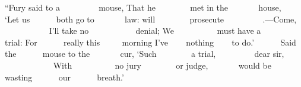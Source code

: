 \documentclass[11pt,openany,oneside]{book}
\begin{document}
{\small {\ttfamily “Fury said to a }}\newline
{\small {\ttfamily ~~~~~~~~ mouse, That he }}\newline
{\small {\ttfamily ~~~~~~~ met in the }}\newline
{\small {\ttfamily ~~~~~~ house, }}\newline
{\small {\ttfamily ~~~~ ‘Let us }}\newline
{\small {\ttfamily ~~~~~ both go to }}\newline
{\small {\ttfamily ~~~~~~ law: }}{\small {}}{\small {\ttfamily  will }}\newline
{\small {\ttfamily ~~~~~~~ prosecute }}\newline
{\small {\ttfamily ~~~~~~~~ }}{\small {}}{\small {\ttfamily .—Come, }}\newline
{\small {\ttfamily ~~~~~~~~~~ I’ll take no }}\newline
{\small {\ttfamily ~~~~~~~~~~ denial; We }}\newline
{\small {\ttfamily ~~~~~~~~~ must have a }}\newline
{\small {\ttfamily ~~~~~~~ trial: For }}\newline
{\small {\ttfamily ~~~~~ really this }}\newline
{\small {\ttfamily ~~~~ morning I’ve }}\newline
{\small {\ttfamily ~~~ nothing }}\newline
{\small {\ttfamily ~~~ to do.’ }}\newline
{\small {\ttfamily ~~~~~ Said the }}\newline
{\small {\ttfamily ~~~~~ mouse to the }}\newline
{\small {\ttfamily ~~~~~~ cur, ‘Such }}\newline
{\small {\ttfamily ~~~~~~~ a trial, }}\newline
{\small {\ttfamily ~~~~~~~~ dear sir, }}\newline
{\small {\ttfamily ~~~~~~~~~~~ With }}\newline
{\small {\ttfamily ~~~~~~~~~ no jury }}\newline
{\small {\ttfamily ~~~~~~~ or judge, }}\newline
{\small {\ttfamily ~~~~~~ would be }}\newline
{\small {\ttfamily ~~~~~ wasting }}\newline
{\small {\ttfamily ~~~~~ our }}\newline
{\small {\ttfamily ~~~~~ breath.’ }}\newline
\end{document}
